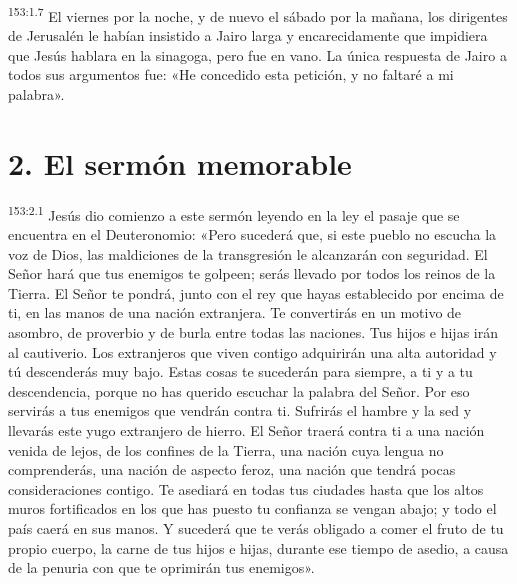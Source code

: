 \par 
\textsuperscript{153:1.7} El viernes por la noche, y de nuevo el sábado por la mañana, los dirigentes de Jerusalén le habían insistido a Jairo larga y encarecidamente que impidiera que Jesús hablara en la sinagoga, pero fue en vano. La única respuesta de Jairo a todos sus argumentos fue: «He concedido esta petición, y no faltaré a mi palabra».

\section*{2. El sermón memorable}
\par 
\textsuperscript{153:2.1} Jesús dio comienzo a este sermón leyendo en la ley el pasaje que se encuentra en el Deuteronomio: «Pero sucederá que, si este pueblo no escucha la voz de Dios, las maldiciones de la transgresión le alcanzarán con seguridad. El Señor hará que tus enemigos te golpeen; serás llevado por todos los reinos de la Tierra. El Señor te pondrá, junto con el rey que hayas establecido por encima de ti, en las manos de una nación extranjera. Te convertirás en un motivo de asombro, de proverbio y de burla entre todas las naciones. Tus hijos e hijas irán al cautiverio. Los extranjeros que viven contigo adquirirán una alta autoridad y tú descenderás muy bajo. Estas cosas te sucederán para siempre, a ti y a tu descendencia, porque no has querido escuchar la palabra del Señor. Por eso servirás a tus enemigos que vendrán contra ti. Sufrirás el hambre y la sed y llevarás este yugo extranjero de hierro. El Señor traerá contra ti a una nación venida de lejos, de los confines de la Tierra, una nación cuya lengua no comprenderás, una nación de aspecto feroz, una nación que tendrá pocas consideraciones contigo. Te asediará en todas tus ciudades hasta que los altos muros fortificados en los que has puesto tu confianza se vengan abajo; y todo el país caerá en sus manos. Y sucederá que te verás obligado a comer el fruto de tu propio cuerpo, la carne de tus hijos e hijas, durante ese tiempo de asedio, a causa de la penuria con que te oprimirán tus enemigos».

